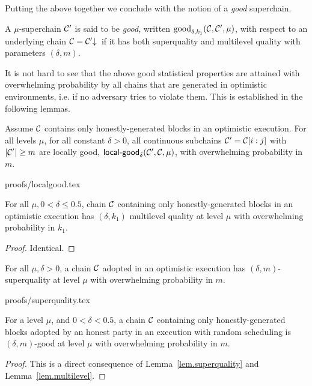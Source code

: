 
Putting the above together we conclude with the notion of a {\em good} superchain.

\begin{definition}\label{lem.good}
A $\mu$-superchain $\mathcal{C}'$ is said to be \textit{good}, written
$\textnormal{good}_{\delta, k_1}(\mathcal{C}, \mathcal{C}', \mu)$, with respect to an
underlying chain $\mathcal{C} = \mathcal{C}'\negthickspace\downarrow\,$ if it has both superquality and multilevel quality with parameters $(\delta, m)$.
\end{definition}

It is not hard to see that the above good statistical properties are attained
with overwhelming probability by all chains that are generated in optimistic
environments, i.e. if no adversary tries to violate them. This is established in
the following lemmas.

\begin{lemma}
\label{lem.localgood}
Assume $\mathcal{C}$ contains only honestly-generated blocks in an optimistic
execution. For all levels $\mu$, for all constant $\delta > 0$, all continuous
subchains $\mathcal{C}' = \mathcal{C}[i:j]$ with $|\mathcal{C}'| \geq m$ are locally good,
$\textsf{local-good}_{\delta}(\mathcal{C}', \mathcal{C}, \mu)$, with overwhelming
probability in $m$.
\end{lemma}
{proofs/localgood.tex}

\begin{lemma}\label{lem.multilevel}
For all $\mu, 0 < \delta \leq 0.5$, chain $\mathcal{C}$ containing only
honestly-generated blocks in an optimistic execution has $(\delta, k_1)$
multilevel quality at level $\mu$ with overwhelming probability in $k_1$.
\end{lemma}
\begin{proof}
Identical.
\Qed
\end{proof}

\begin{lemma}[Superquality]
\label{lem.superquality}
For all $\mu, \delta > 0$, a chain $\mathcal{C}$ adopted in an optimistic execution
has $(\delta, m)$-superquality at level $\mu$ with overwhelming probability in
$m$.
\end{lemma}
{proofs/superquality.tex}

\begin{lemma}
\label{lem.superchain-distribution}
For a level $\mu$, and $0 < \delta < 0.5$, a chain
$\mathcal{C}$ containing only honestly-generated blocks adopted by an honest party in
an execution with random scheduling is $(\delta, m)$-good at level
$\mu$ with overwhelming probability in $m$.
\end{lemma}
\ifonecolumn
\begin{proof}
This is a direct consequence of Lemma~\ref{lem.superquality} and
Lemma~\ref{lem.multilevel}. \Qed
\end{proof}
\fi
